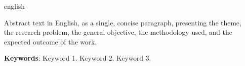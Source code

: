 \begin{resumo}[Abstract]
 \begin{otherlanguage*}{english}

Abstract text in English, as a single, concise paragraph, presenting the theme, the research problem, the general objective, the methodology used, and the expected outcome of the work.

\vspace{\onelineskip}
\noindent \textbf{Keywords}: Keyword 1. Keyword 2. Keyword 3.

 \end{otherlanguage*}
\end{resumo}
